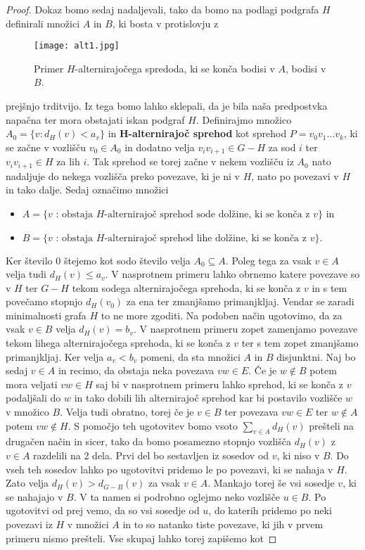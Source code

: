 \documentclass[12pt,a4paper,twoside]{article}
\theoremstyle{definition} %
\theoremstyle{plain} %
\numberwithin{equation}{section}  %
\begin{document}
\begin{proof}
Dokaz bomo sedaj nadaljevali, tako da bomo na podlagi podgrafa $H$ definirali množici $A$ in $B$, ki bosta v protislovju z 
 \begin{figure}[h!]
\caption{Primer $H$-alternirajočega spredoda, ki se konča bodisi v $A$, bodisi v $B$.}
\label{im1}
\centering
    \texttt{[image: alt1.jpg]}
    \end{figure}
prejšnjo trditvijo. Iz tega bomo lahko sklepali, da je bila naša predpostvka napačna ter mora obstajati iskan podgraf $H$. 
Definirajmo množico $A_0 = \{v : d_H(v) < a_v\}$ in \textbf{H-alternirajoč sprehod} kot sprehod $P = v_0v_1\ldots v_k$, ki se začne v vozlišču $v_0 \in A_0$ in dodatno velja $v_iv_{i+1} \in G-H$ za sod $i$ ter $v_iv_{i+1} \in H$ za lih $i$. Tak sprehod se torej začne v nekem vozlišču iz $A_0$ nato nadaljuje do nekega vozlišča preko povezave, ki je ni v $H$, nato po povezavi v $H$ in tako dalje. Sedaj označimo množici
\begin{itemize}
\item $A = \{v \text{ : obstaja $H$-alternirajoč sprehod sode dolžine, ki se konča z $v$}\}$ in
\item $B =\{v \text{ : obstaja $H$-alternirajoč sprehod lihe dolžine, ki se konča z $v$}\}.$
\end{itemize}
Ker število $0$ štejemo kot sodo število velja $A_0 \subseteq A$. Poleg tega za vsak $v \in A$ velja tudi $d_H(v) \le a_v$. V nasprotnem primeru lahko obrnemo katere povezave so v $H$ ter $G-H$ tekom sodega alternirajočega sprehoda, ki se konča z $v$ in s tem povečamo stopnjo $d_H(v_0)$ za ena ter zmanjšamo primanjkljaj. Vendar se zaradi minimalnosti grafa $H$ to ne more zgoditi. Na podoben način ugotovimo, da za vsak $v \in B$ velja $d_H(v) = b_v$. V nasprotnem primeru zopet zamenjamo povezave tekom lihega alternirajočega sprehoda, ki se konča z $v$ ter s tem zopet zmanjšamo primanjkljaj. Ker velja $a_v < b_v$ pomeni, da sta množici $A$ in $B$ disjunktni. Naj bo sedaj $v \in A$ in recimo, da obstaja neka povezava $vw \in E$. Če je $w \notin B$ potem mora veljati $vw \in H$ saj bi v nasprotnem primeru lahko sprehod, ki se konča z $v$ podaljšali do $w$ in tako dobili lih alternirajoč sprehod kar bi postavilo vozlišče $w$ v množico $B$. Velja tudi obratno, torej če je $v \in B$ ter povezava $vw \in  E$ ter $w \notin A$ potem $vw \notin H$. S pomočjo teh ugotovitev bomo vsoto $\sum_{v \in A} d_H(v)$ prešteli na drugačen način in sicer, tako da bomo posamezno stopnjo vozlišča $d_H(v)$ z $v \in  A$ razdelili na 2 dela. Prvi del bo sestavljen iz sosedov od $v$, ki niso v $B$. Do vseh teh sosedov lahko po ugotovitvi pridemo le po povezavi, ki se nahaja v $H$. Zato velja $d_H(v) > d_{G-B}(v)$ za vsak $v \in A$. Mankajo torej še vsi sosedje $v$, ki se nahajajo v $B$. V ta namen si podrobno oglejmo neko vozlišče $u \in B$. Po ugotovitvi od prej vemo, da so vsi sosedje od $u$, do katerih pridemo po neki povezavi iz $H$ v množici $A$ in to so natanko tiste povezave, ki jih v prvem primeru nismo prešteli. Vse skupaj lahko torej zapišemo kot

\end{proof}
\end{document}
